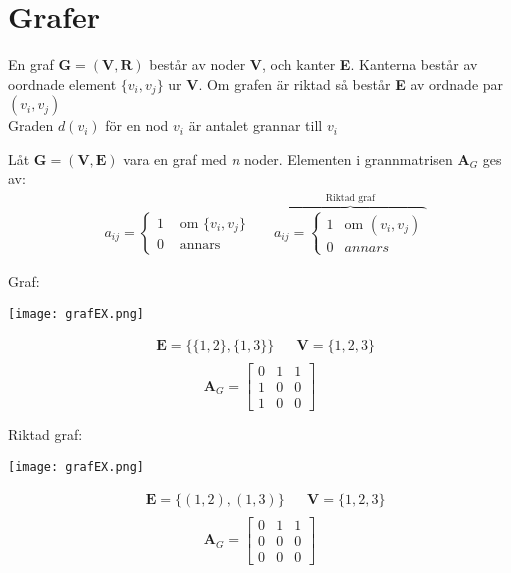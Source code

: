 \section{Grafer} %
\label{sec:grafer}
\begin{Def}
	En graf $\mathbf{G} = (\mathbf{V}, \mathbf{R})$ består av noder \textbf{V}, och kanter \textbf{E}. Kanterna består av oordnade element $\{v_i, v_j\}$ ur \textbf{V}. Om grafen är riktad så består \textbf{E} av ordnade par $(v_i, v_j)$\\
	Graden $d(v_i)$ för en nod $v_i$ är antalet grannar till $v_i$
\end{Def}
\begin{Def}
	Låt $\mathbf{G} = (\mathbf{V}, \mathbf{E})$ vara en graf med \textit{n} noder. Elementen i grannmatrisen $\mathbf{A}_{G}$ ges av:
	\begin{align*}
	&a_{ij} = 
	\begin{cases}
		1 &\mbox{ om } \{v_i, v_j\} \\
		0 &\mbox{ annars}
	\end{cases}
	&& \overbrace{a_{ij} = 
	\begin{cases}
		1 &\mbox{om } (v_i, v_j)\\
		0 &annars
	\end{cases}}^\text{Riktad graf}
	\end{align*}
\end{Def}
\begin{Ex}
Graf:
	\begin{center}
		\texttt{[image: grafEX.png]}
	\end{center}
	\begin{align*}
		&\mathbf{E} = \{ \{1,2\}, \{1,3\}\}
		&& \mathbf{V} = \{1,2,3\}\\
	\end{align*}
	\[
	\mathbf{A}_G = 
		\begin{bmatrix}
			0 & 1 & 1\\
			1 & 0 & 0\\
			1 & 0 & 0
		\end{bmatrix}
	\]
\end{Ex}
\begin{Ex}
	Riktad graf:
	\begin{center}
		\texttt{[image: grafEX.png]}
	\end{center}
	\begin{align*}
		&\mathbf{E} = \{(1,2), (1,3)\}
		&&\mathbf{V} = \{1,2,3\}\\
	\end{align*}
	\[
	\mathbf{A}_G = 
		\begin{bmatrix}
			0 & 1 & 1\\
			0 & 0 & 0\\
			0 & 0 & 0
		\end{bmatrix}
	\]
\end{Ex}
